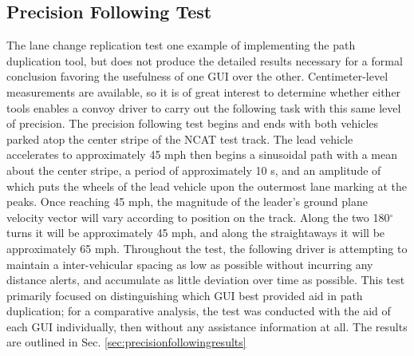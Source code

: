 \subsection{Precision Following Test} \label{sec:targetspacingtest}
The lane change replication test one example of implementing the path duplication tool, but does not produce the detailed results necessary for a formal conclusion favoring the usefulness of one GUI over the other. Centimeter-level measurements are available, so it is of great interest to determine whether either tools enables a convoy driver to carry out the following task with this same level of precision. The precision following test begins and ends with both vehicles parked atop the center stripe of the NCAT test track. The lead vehicle accelerates to approximately 45 mph then begins a sinusoidal path with a mean about the center stripe, a period of approximately 10 s, and an amplitude of which puts the wheels of the lead vehicle upon the outermost lane marking at the peaks. Once reaching 45 mph, the magnitude of the leader's ground plane velocity vector will vary according to position on the track. Along the two 180$^\circ$ turns it will be approximately 45 mph, and along the straightaways it will be approximately 65 mph. Throughout the test, the following driver is attempting to maintain a inter-vehicular spacing as low as possible without incurring any distance alerts, and accumulate as little deviation over time as possible. 
This test primarily focused on distinguishing which GUI best provided aid in path duplication; for a comparative analysis, the test was conducted with the aid of each GUI individually, then without any assistance information at all. The results are outlined in Sec. \ref{sec:precisionfollowingresults}


